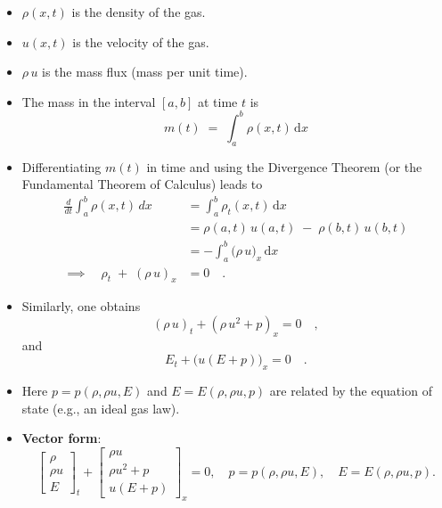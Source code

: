 \begin{itemize}
  \item \(\rho(x,t)\) is the density of the gas.
  \item \(u(x,t)\) is the velocity of the gas.
  \item \(\rho\,u\) is the mass flux (mass per unit time).
  \item The mass in the interval \([a,b]\) at time \(t\) is
        \[
          m(t) \;=\; \int_a^b \rho(x,t)\,\mathrm{d}x
        \]
  \item Differentiating \(m(t)\) in time and using the Divergence Theorem (or the Fundamental Theorem of Calculus) leads to
        \begin{align*}
          \frac{d}{dt}\int_{a}^{b} \rho(x,t)\,dx
                                   & = \int_a^b \rho_t(x,t)\,\mathrm{d}x               \\
                                   & = \rho(a,t)\,u(a,t) \;-\; \rho(b,t)\,u(b,t)       \\
                                   & = - \int_a^b \bigl(\rho\,u\bigr)_x \,\mathrm{d}x
          \\
          \implies \quad
          \rho_t \;+\; (\rho\,u)_x & = 0
          \quad\tag{Conservation of mass}.
        \end{align*}
  \item Similarly, one obtains
        \[
          (\rho\,u)_t + (\rho\,u^2 + p)_x = 0
          \quad\tag{Conservation of momentum},
        \]
        and
        \[
          E_t + \bigl(u(E + p)\bigr)_x = 0
          \quad\tag{Conservation of energy}.
        \]
  \item Here \(p = p(\rho,\rho u,E)\) and \(E = E(\rho,\rho u,p)\) are related by the equation of state (e.g., an ideal gas law).
  \item \textbf{Vector form}:
        \[
          \begin{bmatrix}
            \rho   \\
            \rho u \\
            E
          \end{bmatrix}_t
          +
          \begin{bmatrix}
            \rho u       \\
            \rho u^2 + p \\
            u(E + p)
          \end{bmatrix}_x
          = 0,
          \quad
          p = p(\rho,\rho u,E),\quad
          E = E(\rho,\rho u,p).
        \]
\end{itemize}

